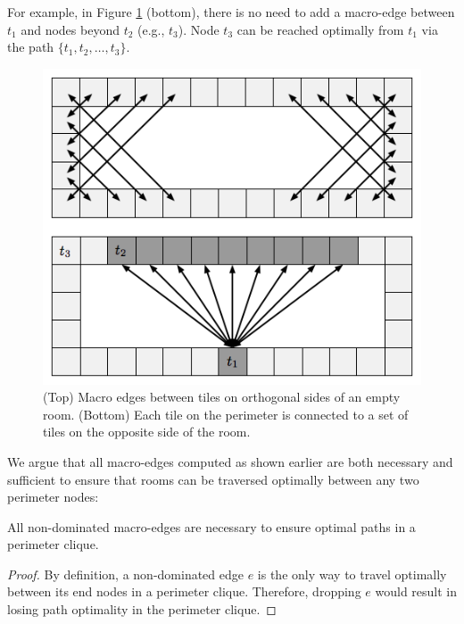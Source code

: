For example, in Figure \ref{fig-macroedges} (bottom), there is no need to add a macro-edge between $t_1$
and nodes beyond $t_2$ (e.g., $t_3$). Node $t_3$ can be reached optimally from $t_1$ via the path
$\lbrace t_1, t_2, \dots, t_3 \rbrace$.

\begin{figure}[tb]
       \begin{center}
                       \includegraphics[scale=0.5, trim = 10mm 10mm 10mm 0mm]{diagrams/macroedges.png}
       \end{center}
	\vspace{-3pt}
       \caption{(Top) Macro edges between tiles on orthogonal sides of an empty room. 
(Bottom) Each tile on the perimeter is connected to a set of tiles on the opposite side of the room.}
       \label{fig-macroedges}
\end{figure}

We argue that all macro-edges computed as shown earlier are both necessary and sufficient
to ensure that rooms can be traversed optimally between any two perimeter nodes:

\begin{proposition}
All non-dominated macro-edges are necessary to ensure optimal paths in a perimeter clique.
\end{proposition}
\begin{proof}
By definition, a non-dominated edge $e$ is the only way to travel optimally between 
its end nodes in a perimeter clique. Therefore, dropping $e$ would result in losing path optimality
in the perimeter clique.
\end{proof}

